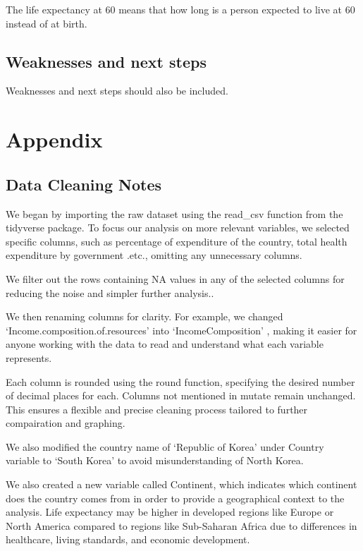 \documentclass[
  letterpaper,
  DIV=11,
  numbers=noendperiod]{scrartcl}
\begin{document}
The life expectancy at 60 means that how long is a person expected to
live at 60 instead of at birth.

\subsection{Weaknesses and next steps}\label{weaknesses-and-next-steps}

Weaknesses and next steps should also be included.

\newpage

\appendix

\section{Appendix}\label{sec-appendix}

\subsection{Data Cleaning Notes}\label{data-cleaning-notes}

We began by importing the raw dataset using the read\_csv function from
the tidyverse package. To focus our analysis on more relevant variables,
we selected specific columns, such as percentage of expenditure of the
country, total health expenditure by government .etc., omitting any
unnecessary columns.

We filter out the rows containing NA values in any of the selected
columns for reducing the noise and simpler further analysis..

We then renaming columns for clarity. For example, we changed
`Income.composition.of.resources' into `IncomeComposition' , making it
easier for anyone working with the data to read and understand what each
variable represents.

Each column is rounded using the round function, specifying the desired
number of decimal places for each. Columns not mentioned in mutate
remain unchanged. This ensures a flexible and precise cleaning process
tailored to further compairation and graphing.

We also modified the country name of `Republic of Korea' under Country
variable to `South Korea' to avoid misunderstanding of North Korea.

We also created a new variable called Continent, which indicates which
continent does the country comes from in order to provide a geographical
context to the analysis. Life expectancy may be higher in developed
regions like Europe or North America compared to regions like
Sub-Saharan Africa due to differences in healthcare, living standards,
and economic development.
\end{document}
